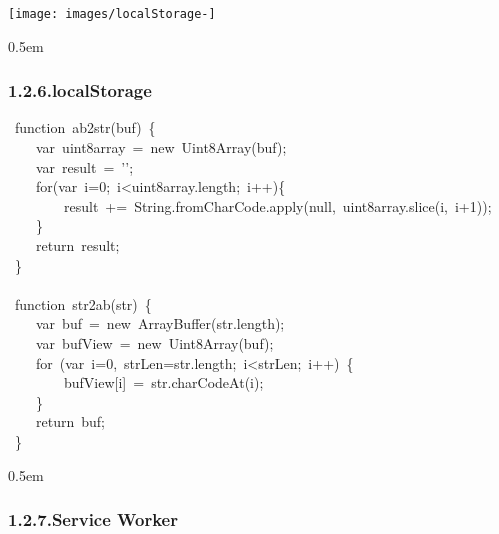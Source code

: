 \documentclass{article}
\begin{document}
\begin{mdcenter}%

\noindent{}\texttt{[image: images/localStorage-]}{}%
\end{mdcenter}%

\noindent{}%

\begin{mdbmargintb}{}{0.5em}%
\subsubsection{1.2.6.\hspace*{0.5em}localStorage}\label{sec-localstorage}%
\end{mdbmargintb}%

\noindent{}%
\begin{mdpre}%
\noindent~{function}~ab2str(buf)~\{\\
~~~~{var}~uint8array~=~{new}~Uint8Array(buf);\\
~~~~{var}~result~=~{'}{'};\\
~~~~{for}({var}~i={0};~i\textless{}uint8array.length;~i++)\{\\
~~~~~~~~result~+=~String.fromCharCode.apply({null},~uint8array.slice(i,~i+{1}));\\
~~~~\}\\
~~~~{return}~result;\\
~\}\\
~\\
~{function}~str2ab(str)~\{\\
~~~~{var}~buf~=~{new}~ArrayBuffer(str.length);\\
~~~~{var}~bufView~=~{new}~Uint8Array(buf);\\
~~~~{for}~({var}~i={0},~strLen=str.length;~i\textless{}strLen;~i++)~\{\\
~~~~~~~~bufView{}[i]~=~str.charCodeAt(i);\\
~~~~\}\\
~~~~{return}~buf;\\
~\}%
\end{mdpre}
\begin{mdbmargintb}{}{0.5em}%
\subsubsection{1.2.7.\hspace*{0.5em}Service  Worker}\label{sec-service-worker}%
\end{mdbmargintb}%
\end{document}
